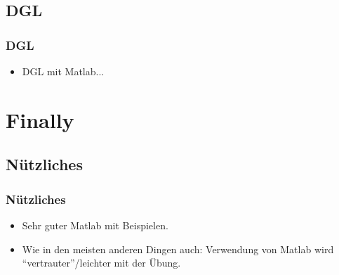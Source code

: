   \subsection{DGL}
  \begin{frame}
      \frametitle{DGL}
      \begin{itemize}
        \item DGL mit Matlab...
      \end{itemize}
  \end{frame}


  \section{Finally}

  \subsection{Nützliches}
  \begin{frame}
      \frametitle{Nützliches}
      \begin{itemize}
          \item Sehr guter Matlab  mit Beispielen.
          \item Wie in den meisten anderen Dingen auch: Verwendung von Matlab wird ``vertrauter''/leichter mit der Übung.
      \end{itemize}
  \end{frame}




